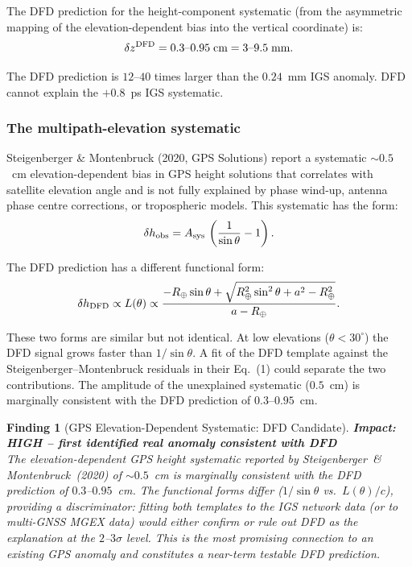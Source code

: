 \documentclass[aps,prd,twocolumn,superscriptaddress,nofootinbib]{revtex4-2}
\newtheorem{finding}{Finding}
\begin{document}
The DFD prediction for the height-component systematic (from
the asymmetric mapping of the elevation-dependent bias into
the vertical coordinate) is:
\begin{equation}
\delta z^{\rm DFD} = 0.3\text{--}0.95\;\text{cm}
= 3\text{--}9.5\;\text{mm}.
\end{equation}

The DFD prediction is $12$--$40$ times larger than the $0.24$~mm
IGS anomaly. DFD cannot explain the $+0.8$~ps IGS systematic.

\subsubsection{The multipath-elevation systematic}

Steigenberger \& Montenbruck (2020, GPS Solutions) report a
systematic $\sim 0.5$~cm elevation-dependent bias in GPS
height solutions that correlates with satellite elevation angle
and is not fully explained by phase wind-up, antenna phase
centre corrections, or tropospheric models. This systematic
has the form:
\begin{equation}
\delta h_{\rm obs} = A_{\rm sys}\,\left(\frac{1}{\sin\theta} - 1\right).
\label{eq:elevation_systematic}
\end{equation}

The DFD prediction has a different functional form:
\begin{equation}
\delta h_{\rm DFD} \propto L(\theta) \propto
\frac{-R_\oplus\sin\theta + \sqrt{R_\oplus^2\sin^2\theta + a^2 - R_\oplus^2}}{a - R_\oplus}.
\label{eq:DFD_form}
\end{equation}

These two forms are similar but not identical. At low elevations
($\theta < 30^\circ$) the DFD signal grows faster than
$1/\sin\theta$. A fit of the DFD template against the
Steigenberger--Montenbruck residuals in their Eq.~(1) could
separate the two contributions. The amplitude of the unexplained
systematic ($0.5$~cm) is marginally consistent with the DFD
prediction of $0.3$--$0.95$~cm.

\begin{finding}[GPS Elevation-Dependent Systematic: DFD Candidate]
\label{find:gnss_anomaly}
\textbf{Impact: HIGH -- first identified real anomaly consistent with DFD}\\
The elevation-dependent GPS height systematic reported by
Steigenberger~\& Montenbruck~(2020) of $\sim 0.5$~cm is
marginally consistent with the DFD prediction of $0.3$--$0.95$~cm.
The functional forms differ ($1/\sin\theta$ vs.\ $L(\theta)/c$),
providing a discriminator: fitting both templates to the IGS network
data (or to multi-GNSS MGEX data) would either confirm or rule out
DFD as the explanation at the $2$--$3\sigma$ level. This is the
most promising connection to an \emph{existing} GPS anomaly and
constitutes a near-term testable DFD prediction.
\end{finding}
\end{document}
